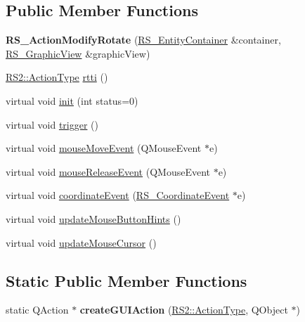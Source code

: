 \subsection*{Public Member Functions}
\begin{DoxyCompactItemize}
\item 
\hypertarget{classRS__ActionModifyRotate_af3209d12483078afd1693960fbaa8332}{{\bfseries R\-S\-\_\-\-Action\-Modify\-Rotate} (\hyperlink{classRS__EntityContainer}{R\-S\-\_\-\-Entity\-Container} \&container, \hyperlink{classRS__GraphicView}{R\-S\-\_\-\-Graphic\-View} \&graphic\-View)}\label{classRS__ActionModifyRotate_af3209d12483078afd1693960fbaa8332}

\item 
\hyperlink{classRS2_afe3523e0bc41fd637b892321cfc4b9d7}{R\-S2\-::\-Action\-Type} \hyperlink{classRS__ActionModifyRotate_a00787b6c8c83c97268715b7679c91515}{rtti} ()
\item 
virtual void \hyperlink{classRS__ActionModifyRotate_a7a81eb9e99548f97ca4aa91f9e1a07c8}{init} (int status=0)
\item 
virtual void \hyperlink{classRS__ActionModifyRotate_a6621ca4a012ec6e7054bea070cc18034}{trigger} ()
\item 
virtual void \hyperlink{classRS__ActionModifyRotate_a88ab009acdfead296a90b69b054bab72}{mouse\-Move\-Event} (Q\-Mouse\-Event $\ast$e)
\item 
virtual void \hyperlink{classRS__ActionModifyRotate_adb5b21cdaf03cea007426b810ceea03a}{mouse\-Release\-Event} (Q\-Mouse\-Event $\ast$e)
\item 
virtual void \hyperlink{classRS__ActionModifyRotate_a53adcb5963b9668cd1f570d8ee7c0a2c}{coordinate\-Event} (\hyperlink{classRS__CoordinateEvent}{R\-S\-\_\-\-Coordinate\-Event} $\ast$e)
\item 
virtual void \hyperlink{classRS__ActionModifyRotate_a8eda3b689f85e95462398510e92e24fc}{update\-Mouse\-Button\-Hints} ()
\item 
virtual void \hyperlink{classRS__ActionModifyRotate_a97344b43546a485adf0a9872fe1242f8}{update\-Mouse\-Cursor} ()
\end{DoxyCompactItemize}
\subsection*{Static Public Member Functions}
\begin{DoxyCompactItemize}
\item 
\hypertarget{classRS__ActionModifyRotate_aff966bda062531b626cd7396d8c3c569}{static Q\-Action $\ast$ {\bfseries create\-G\-U\-I\-Action} (\hyperlink{classRS2_afe3523e0bc41fd637b892321cfc4b9d7}{R\-S2\-::\-Action\-Type}, Q\-Object $\ast$)}\label{classRS__ActionModifyRotate_aff966bda062531b626cd7396d8c3c569}

\end{DoxyCompactItemize}
